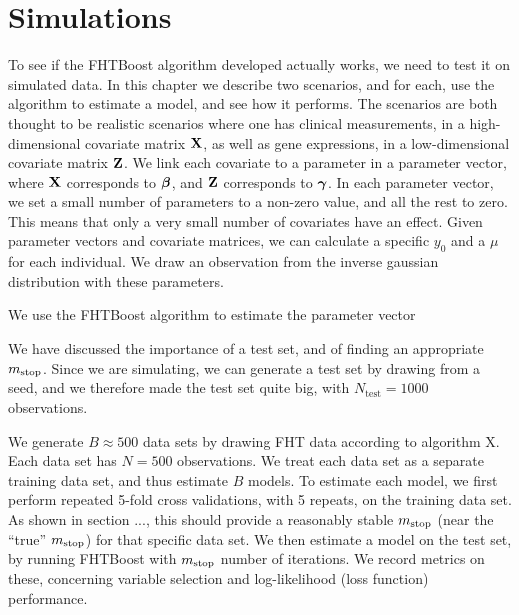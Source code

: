 \chapter{Simulations}
To see if the FHTBoost algorithm developed actually works, we need to test it on simulated data. In this chapter we describe two scenarios,
and for each, use the algorithm to estimate a model, and see how it performs. The scenarios are both thought to be realistic scenarios
where one has clinical measurements, in a high-dimensional covariate matrix $\mathbf{X}$, as well as gene expressions,
in a low-dimensional covariate matrix $\mathbf{Z}$. We link each covariate to a parameter in a parameter vector,
where $\mathbf{X}$ corresponds to $\boldsymbol{\beta}$, and $\mathbf{Z}$ corresponds to $\boldsymbol{\gamma}$. In each parameter vector, we set a small number of parameters
to a non-zero value, and all the rest to zero. This means that only a very small number of covariates have an effect.
Given parameter vectors and covariate matrices, we can calculate a specific $y_0$ and a $\mu$ for each individual.
We draw an observation from the inverse gaussian distribution with these parameters.

We use the FHTBoost algorithm to estimate the parameter vector

We have discussed the importance of a test set, and of finding an appropriate $m_{\text{stop}}$. Since we are simulating, we can generate a test set
by drawing from a seed, and we therefore made the test set quite big, with $N_{\text{test}}=1000$ observations.

We generate $B\approx500$ data sets by drawing FHT data according to algorithm X. Each data set has $N=500$ observations. 
We treat each data set as a separate training data set, and thus estimate $B$ models.
To estimate each model, we first perform repeated 5-fold cross validations, with 5 repeats, on the training data set.
As shown in section ..., this should provide a reasonably stable $m_{\text{stop}}$ (near the ``true'' $m_{\text{stop}}$) for that specific data set.
We then estimate a model on the test set, by running FHTBoost with $m_{\text{stop}}$ number of iterations. We record metrics on these,
concerning variable selection and log-likelihood (loss function) performance.


